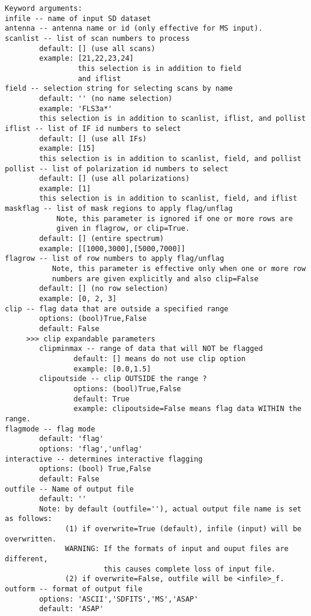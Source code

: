 \begin{verbatim}
Keyword arguments:
infile -- name of input SD dataset
antenna -- antenna name or id (only effective for MS input). 
scanlist -- list of scan numbers to process
        default: [] (use all scans)
        example: [21,22,23,24]
                 this selection is in addition to field
                 and iflist
field -- selection string for selecting scans by name
        default: '' (no name selection)
        example: 'FLS3a*'
        this selection is in addition to scanlist, iflist, and pollist
iflist -- list of IF id numbers to select
        default: [] (use all IFs)
        example: [15]
        this selection is in addition to scanlist, field, and pollist
pollist -- list of polarization id numbers to select
        default: [] (use all polarizations)
        example: [1]
        this selection is in addition to scanlist, field, and iflist
maskflag -- list of mask regions to apply flag/unflag 
            Note, this parameter is ignored if one or more rows are 
            given in flagrow, or clip=True.
        default: [] (entire spectrum)
        example: [[1000,3000],[5000,7000]]
flagrow -- list of row numbers to apply flag/unflag
           Note, this parameter is effective only when one or more row 
           numbers are given explicitly and also clip=False
        default: [] (no row selection)
        example: [0, 2, 3]
clip -- flag data that are outside a specified range
        options: (bool)True,False
        default: False
     >>> clip expandable parameters
        clipminmax -- range of data that will NOT be flagged
                default: [] means do not use clip option
                example: [0.0,1.5]
        clipoutside -- clip OUTSIDE the range ?
                options: (bool)True,False
                default: True
                example: clipoutside=False means flag data WITHIN the range.
flagmode -- flag mode
        default: 'flag'
        options: 'flag','unflag'
interactive -- determines interactive flagging
        options: (bool) True,False
        default: False
outfile -- Name of output file
        default: ''
        Note: by default (outfile=''), actual output file name is set as follows: 
              (1) if overwrite=True (default), infile (input) will be overwritten.
              WARNING: If the formats of input and ouput files are different, 
                       this causes complete loss of input file.
              (2) if overwrite=False, outfile will be <infile>_f. 
outform -- format of output file
        options: 'ASCII','SDFITS','MS','ASAP'
        default: 'ASAP'

\end{verbatim}
